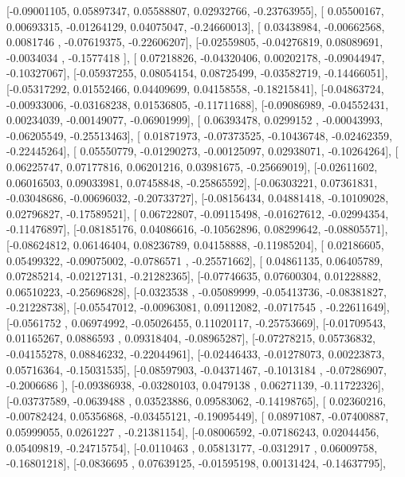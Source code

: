 \documentclass{article}
\begin{document}
       [-0.09001105,  0.05897347,  0.05588807,  0.02932766, -0.23763955],
       [ 0.05500167,  0.00693315, -0.01264129,  0.04075047, -0.24660013],
       [ 0.03438984, -0.00662568,  0.0081746 , -0.07619375, -0.22606207],
       [-0.02559805, -0.04276819,  0.08089691, -0.0034034 , -0.1577418 ],
       [ 0.07218826, -0.04320406,  0.00202178, -0.09044947, -0.10327067],
       [-0.05937255,  0.08054154,  0.08725499, -0.03582719, -0.14466051],
       [-0.05317292,  0.01552466,  0.04409699,  0.04158558, -0.18215841],
       [-0.04863724, -0.00933006, -0.03168238,  0.01536805, -0.11711688],
       [-0.09086989, -0.04552431,  0.00234039, -0.00149077, -0.06901999],
       [ 0.06393478,  0.0299152 , -0.00043993, -0.06205549, -0.25513463],
       [ 0.01871973, -0.07373525, -0.10436748, -0.02462359, -0.22445264],
       [ 0.05550779, -0.01290273, -0.00125097,  0.02938071, -0.10264264],
       [ 0.06225747,  0.07177816,  0.06201216,  0.03981675, -0.25669019],
       [-0.02611602,  0.06016503,  0.09033981,  0.07458848, -0.25865592],
       [-0.06303221,  0.07361831, -0.03048686, -0.00696032, -0.20733727],
       [-0.08156434,  0.04881418, -0.10109028,  0.02796827, -0.17589521],
       [ 0.06722807, -0.09115498, -0.01627612, -0.02994354, -0.11476897],
       [-0.08185176,  0.04086616, -0.10562896,  0.08299642, -0.08805571],
       [-0.08624812,  0.06146404,  0.08236789,  0.04158888, -0.11985204],
       [ 0.02186605,  0.05499322, -0.09075002, -0.0786571 , -0.25571662],
       [ 0.04861135,  0.06405789,  0.07285214, -0.02127131, -0.21282365],
       [-0.07746635,  0.07600304,  0.01228882,  0.06510223, -0.25696828],
       [-0.0323538 , -0.05089999, -0.05413736, -0.08381827, -0.21228738],
       [-0.05547012, -0.00963081,  0.09112082, -0.0717545 , -0.22611649],
       [-0.0561752 ,  0.06974992, -0.05026455,  0.11020117, -0.25753669],
       [-0.01709543,  0.01165267,  0.0886593 ,  0.09318404, -0.08965287],
       [-0.07278215,  0.05736832, -0.04155278,  0.08846232, -0.22044961],
       [-0.02446433, -0.01278073,  0.00223873,  0.05716364, -0.15031535],
       [-0.08597903, -0.04371467, -0.1013184 , -0.07286907, -0.2006686 ],
       [-0.09386938, -0.03280103,  0.0479138 ,  0.06271139, -0.11722326],
       [-0.03737589, -0.0639488 ,  0.03523886,  0.09583062, -0.14198765],
       [ 0.02360216, -0.00782424,  0.05356868, -0.03455121, -0.19095449],
       [ 0.08971087, -0.07400887,  0.05999055,  0.0261227 , -0.21381154],
       [-0.08006592, -0.07186243,  0.02044456,  0.05409819, -0.24715754],
       [-0.0110463 ,  0.05813177, -0.0312917 ,  0.06009758, -0.16801218],
       [-0.0836695 ,  0.07639125, -0.01595198,  0.00131424, -0.14637795],
\end{document}
